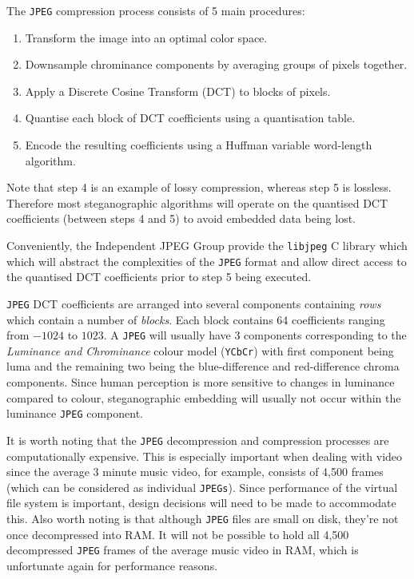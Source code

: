 \documentclass[paper=a4, fontsize=11pt,twoside]{scrartcl}    %
\numberwithin{table}{section}
\numberwithin{figure}{section}
\numberwithin{algorithm}{section}
\begin{document}
The \texttt{JPEG} compression process consists of 5 main procedures:
\begin{enumerate}
	\item Transform the image into an optimal color space. 
	\item Downsample chrominance components by averaging groups of pixels together.
	\item Apply a Discrete Cosine Transform (DCT) to blocks of pixels. 
	\item Quantise each block of DCT coefficients using a quantisation table. 
	\item Encode the resulting coefficients using a Huffman variable word-length algorithm. 
\end{enumerate}

\noindent
Note that step 4 is an example of lossy compression, whereas step 5 is lossless. Therefore most steganographic algorithms will operate on the quantised DCT coefficients (between steps 4 and 5) to avoid embedded data being lost.

Conveniently, the Independent JPEG Group provide the \texttt{libjpeg} C library which which will abstract the complexities of the \texttt{JPEG} format and allow direct access to the quantised DCT coefficients prior to step 5 being executed.

\texttt{JPEG} DCT coefficients are arranged into several components containing \textit{rows} which contain a number of \textit{blocks}. Each block contains 64 coefficients ranging from $-1024$ to $1023$. A \texttt{JPEG} will usually have 3 components corresponding to the \textit{Luminance and Chrominance} colour model (\texttt{YCbCr}) with first component being luma and the remaining two being the blue-difference and red-difference chroma components. Since human perception is more sensitive to changes in luminance compared to colour, steganographic embedding will usually not occur within the luminance \texttt{JPEG} component.

It is worth noting that the \texttt{JPEG} decompression and compression processes are computationally expensive. This is especially important when dealing with video since the average 3 minute music video, for example, consists of 4,500 frames (which can be considered as individual \texttt{JPEGs}). Since performance of the virtual file system is important, design decisions will need to be made to accommodate this. Also worth noting is that although \texttt{JPEG} files are small on disk, they're not once decompressed into RAM. It will not be possible to hold all 4,500 decompressed \texttt{JPEG} frames of the average music video in RAM, which is unfortunate again for performance reasons.
\end{document}
